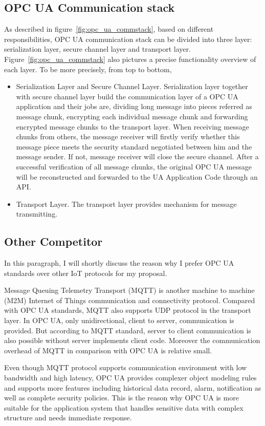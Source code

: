\subsection{OPC UA Communication stack}
As described in figure~\ref{fig:opc_ua_commstack}, based on different responsibilities, OPC UA communication stack can be divided into three layer: serialization layer, secure channel layer and transport layer.  Figure~\ref{fig:opc_ua_commstack} also pictures a precise functionality overview of each layer. To be more precisely, from top to bottom,
\begin{itemize}
\item{Serialization Layer} and {Secure Channel Layer}.  Serialization layer together with secure channel layer build the communication layer of a OPC UA application and their jobs are, dividing long message into pieces referred as message chunk, encrypting each individual message chunk and forwarding encrypted message chunks to the transport layer. When receiving message chunks from others, the message receiver will firstly verify whether this message piece meets the security standard negotiated between him and the message sender. If not, message receiver will close the secure channel. After a successful verification of all message chunks, the original OPC UA message will be reconstructed and forwarded to the UA Application Code through an API. 

\item{Transport Layer}. The transport layer provides mechanism for message transmitting.
\end{itemize}

\subsection{Other Competitor}
In this paragraph, I will shortly discuss the reason why I prefer OPC UA standards over other IoT protocols for my proposal.

Message Queuing Telemetry Transport (MQTT) \cite{Ref3} is another machine to machine (M2M) Internet of Things communication and connectivity protocol. Compared with OPC UA standards, MQTT also supports UDP protocol in the transport layer. In OPC UA, only unidirectional, client to server, communication is provided. But  according to MQTT standard, server to client communication is also possible without server implements client code. Moreover the communication overhead of MQTT in comparison with OPC UA is relative small. 


Even though MQTT protocol supports communication environment with low bandwidth and high latency, OPC UA provides complexer object modeling rules and supports more features including historical data record, alarm, notification as well as complete security policies. This is the reason why OPC UA is more suitable for the application system that handles sensitive data with complex structure and needs immediate response.


